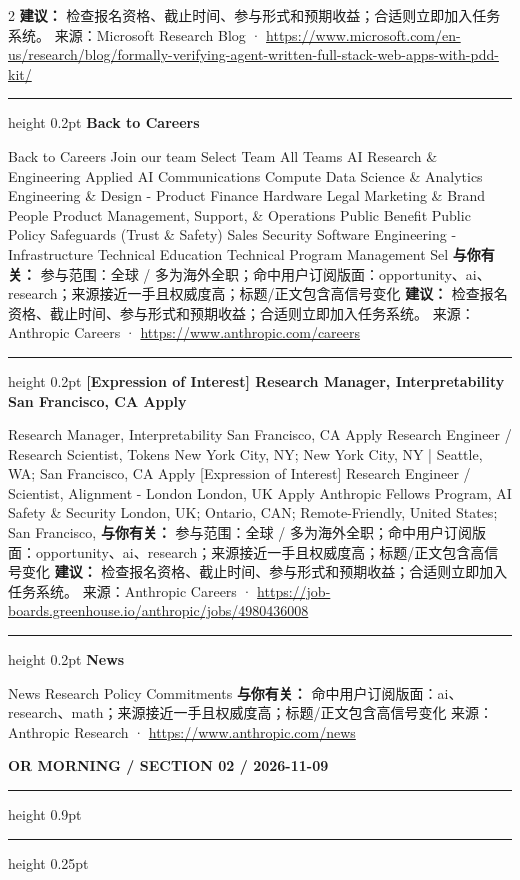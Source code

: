 \documentclass[10.5pt]{ctexart}
\begin{document}
\begin{multicols}{2}
\textbf{建议：} 检查报名资格、截止时间、参与形式和预期收益；合适则立即加入任务系统。
{\footnotesize\color{ormuted} 来源：Microsoft Research Blog · \url{https://www.microsoft.com/en-us/research/blog/formally-verifying-agent-written-full-stack-web-apps-with-pdd-kit/}}
\vspace{2mm}
\hrule height 0.2pt
\vspace{2mm}
{\large\bfseries Back to Careers}\par
Back to Careers Join our team Select Team All Teams AI Research \& Engineering Applied AI Communications Compute Data Science \& Analytics Engineering \& Design - Product Finance Hardware Legal Marketing \& Brand People Product Management, Support, \& Operations Public Benefit Public Policy Safeguards (Trust \& Safety) Sales Security Software Engineering - Infrastructure Technical Education Technical Program Management Sel
\textbf{与你有关：} 参与范围：全球 / 多为海外全职；命中用户订阅版面：opportunity、ai、research；来源接近一手且权威度高；标题/正文包含高信号变化
\textbf{建议：} 检查报名资格、截止时间、参与形式和预期收益；合适则立即加入任务系统。
{\footnotesize\color{ormuted} 来源：Anthropic Careers · \url{https://www.anthropic.com/careers}}
\vspace{2mm}
\hrule height 0.2pt
\vspace{2mm}
{\large\bfseries [Expression of Interest] Research Manager, Interpretability San Francisco, CA Apply}\par
[Expression of Interest] Research Manager, Interpretability San Francisco, CA Apply Research Engineer / Research Scientist, Tokens New York City, NY; New York City, NY | Seattle, WA; San Francisco, CA Apply [Expression of Interest] Research Engineer / Scientist, Alignment - London London, UK Apply Anthropic Fellows Program, AI Safety \& Security London, UK; Ontario, CAN; Remote-Friendly, United States; San Francisco, 
\textbf{与你有关：} 参与范围：全球 / 多为海外全职；命中用户订阅版面：opportunity、ai、research；来源接近一手且权威度高；标题/正文包含高信号变化
\textbf{建议：} 检查报名资格、截止时间、参与形式和预期收益；合适则立即加入任务系统。
{\footnotesize\color{ormuted} 来源：Anthropic Careers · \url{https://job-boards.greenhouse.io/anthropic/jobs/4980436008}}
\vspace{2mm}
\hrule height 0.2pt
\vspace{2mm}
{\large\bfseries News}\par
News Research Policy Commitments
\textbf{与你有关：} 命中用户订阅版面：ai、research、math；来源接近一手且权威度高；标题/正文包含高信号变化
{\footnotesize\color{ormuted} 来源：Anthropic Research · \url{https://www.anthropic.com/news}}
\end{multicols}
\newpage
{\small\bfseries OR MORNING / SECTION 02 / 2026-11-09}
\vspace{2mm}
\hrule height 0.9pt
\vspace{1.5mm}
\hrule height 0.25pt
\vspace{4mm}
\end{document}
